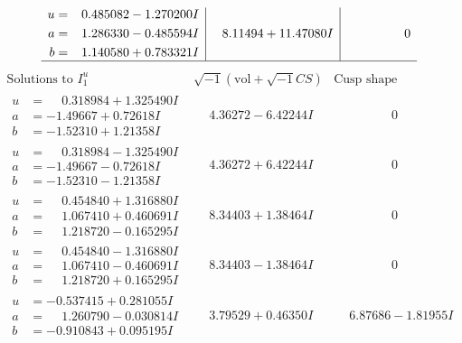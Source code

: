 \documentclass[1p]{elsarticle_modified}
\theoremstyle{definition}
\newcommand{\I}{\sqrt{-1}}
\begin{document}
$$\begin{array}{c|c|c}
\begin{aligned}
u &= \phantom{-}0.485082 - 1.270200 I \\
a &= \phantom{-}1.286330 - 0.485594 I \\
b &= \phantom{-}1.140580 + 0.783321 I\end{aligned}
 & \phantom{-}8.11494 + 11.47080 I & \phantom{-0.000000 } 0\\
 \hline 
 \end{array}$$\newpage$$\begin{array}{c|c|c}  
\text{Solutions to }I^u_{1}& \I (\text{vol} + \sqrt{-1}CS) & \text{Cusp shape}\\
 \hline 
\begin{aligned}
u &= \phantom{-}0.318984 + 1.325490 I \\
a &= -1.49667 + 0.72618 I \\
b &= -1.52310 + 1.21358 I\end{aligned}
 & \phantom{-}4.36272 - 6.42244 I & \phantom{-0.000000 } 0 \\ \hline\begin{aligned}
u &= \phantom{-}0.318984 - 1.325490 I \\
a &= -1.49667 - 0.72618 I \\
b &= -1.52310 - 1.21358 I\end{aligned}
 & \phantom{-}4.36272 + 6.42244 I & \phantom{-0.000000 } 0 \\ \hline\begin{aligned}
u &= \phantom{-}0.454840 + 1.316880 I \\
a &= \phantom{-}1.067410 + 0.460691 I \\
b &= \phantom{-}1.218720 - 0.165295 I\end{aligned}
 & \phantom{-}8.34403 + 1.38464 I & \phantom{-0.000000 } 0 \\ \hline\begin{aligned}
u &= \phantom{-}0.454840 - 1.316880 I \\
a &= \phantom{-}1.067410 - 0.460691 I \\
b &= \phantom{-}1.218720 + 0.165295 I\end{aligned}
 & \phantom{-}8.34403 - 1.38464 I & \phantom{-0.000000 } 0 \\ \hline\begin{aligned}
u &= -0.537415 + 0.281055 I \\
a &= \phantom{-}1.260790 - 0.030814 I \\
b &= -0.910843 + 0.095195 I\end{aligned}
 & \phantom{-}3.79529 + 0.46350 I & \phantom{-}6.87686 - 1.81955 I \\ \hline\begin{aligned}

\end{aligned}
\end{array}$$
\end{document}
